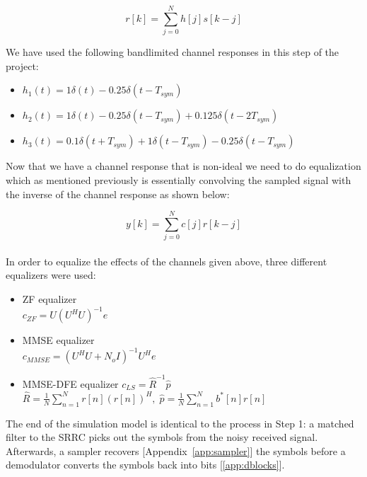 \documentclass[]{article}
\begin{document}
\begin{equation}
\label{eq:channel}
r\left[k\right] = \sum_{j=0}^N h[j]s\left[k-j\right]
\end{equation}

We have used the following bandlimited channel responses in this step of the project:

\begin{itemize}
\item $h_1(t) = 1\delta(t) - 0.25\delta(t - T_{sym})  $
\item $h_2(t) = 1\delta(t) - 0.25\delta(t - T_{sym})   + 0.125\delta(t - 2T_{sym}) $
\item $h_3(t) = 0.1\delta(t + T_{sym}) +1\delta(t - T_{sym}) - 0.25\delta(t - T_{sym})   $
\end{itemize} 

Now that we have a channel response that is non-ideal we need to do equalization which as mentioned previously is essentially convolving the sampled signal with the inverse of the channel response as shown below: 

\begin{equation}
\label{eq:channel}
y\left[k\right] = \sum_{j=0}^N c[j]r\left[k-j\right]
\end{equation}
\\
In order to equalize the effects of the channels given above, three different equalizers were used: 

\begin{itemize}
\item ZF equalizer \\
$c_{ZF} = U(U^HU)^{-1}e$ \\
\item MMSE equalizer \\
$c_{MMSE} = (U^HU + N_oI)^{-1}U^He$ \\
\item MMSE-DFE equalizer
$c_{LS} = \hat{R}^{-1}\hat{p} $ \\
$ \hat{R} = \frac{1}{N} \sum_{n=1}^N r[n](r[n])^H, \; \hat{p} = \frac{1}{N}\sum_{n=1}^N b^*[n]r[n]$ \\


\end{itemize}


The end of the simulation model is identical to the process in Step 1: a matched filter to the SRRC picks out the symbols from the noisy received signal.  Afterwards, a sampler recovers [Appendix~\ref{app:sampler}] the symbols before a demodulator converts the symbols back into bits [\ref{app:dblocks}].  
\end{document}
